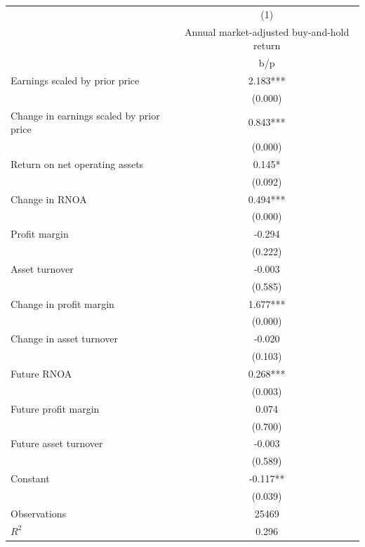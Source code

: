 {
\def\sym#1{\ifmmode^{#1}\else\(^{#1}\)\fi}
\begin{tabular}{l*{1}{c}}
\hline\hline
                    &\multicolumn{1}{c}{(1)}\\
                    &\multicolumn{1}{c}{Annual market-adjusted buy-and-hold return}\\
                    &         b/p   \\
\hline
Earnings scaled by prior price&       2.183***\\
                    &     (0.000)   \\
Change in earnings scaled by prior price&       0.843***\\
                    &     (0.000)   \\
Return on net operating assets&       0.145*  \\
                    &     (0.092)   \\
Change in RNOA      &       0.494***\\
                    &     (0.000)   \\
Profit margin       &      -0.294   \\
                    &     (0.222)   \\
Asset turnover      &      -0.003   \\
                    &     (0.585)   \\
Change in profit margin&       1.677***\\
                    &     (0.000)   \\
Change in asset turnover&      -0.020   \\
                    &     (0.103)   \\
Future RNOA         &       0.268***\\
                    &     (0.003)   \\
Future profit margin&       0.074   \\
                    &     (0.700)   \\
Future asset turnover&      -0.003   \\
                    &     (0.589)   \\
Constant            &      -0.117** \\
                    &     (0.039)   \\
\hline
Observations        &       25469   \\
\(R^{2}\)           &       0.296   \\
\hline\hline
\end{tabular}
}
